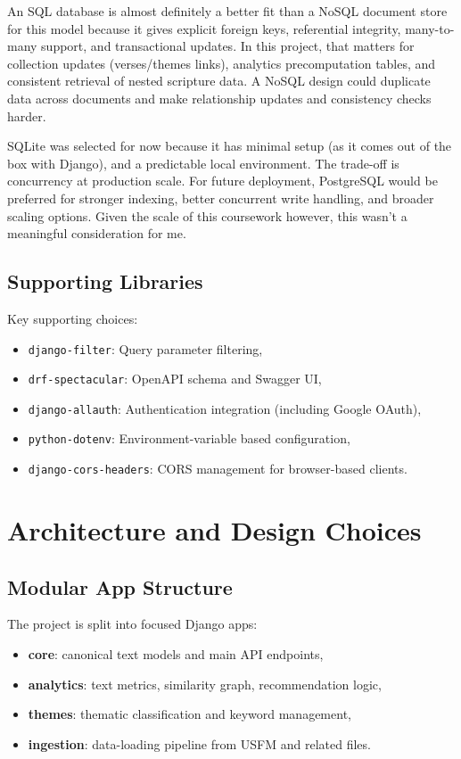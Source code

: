 \documentclass[11pt,a4paper]{article}
\begin{document}
An SQL database is almost definitely a better fit than a NoSQL document store for this model because it gives explicit foreign keys, referential integrity, many-to-many support, and transactional updates. In this project, that matters for collection updates (verses/themes links), analytics precomputation tables, and consistent retrieval of nested scripture data. A NoSQL design could duplicate data across documents and make relationship updates and consistency checks harder.

SQLite was selected for now because it has minimal setup (as it comes out of the box with Django), and a predictable local environment. The trade-off is concurrency at production scale. For future deployment, PostgreSQL would be preferred for stronger indexing, better concurrent write handling, and broader scaling options. Given the scale of this coursework however, this wasn't a meaningful consideration for me.

\subsection{Supporting Libraries}
Key supporting choices:
\begin{itemize}[leftmargin=*]
	\item \texttt{django-filter}: Query parameter filtering,
	\item \texttt{drf-spectacular}: OpenAPI schema and Swagger UI,
	\item \texttt{django-allauth}: Authentication integration (including Google OAuth),
	\item \texttt{python-dotenv}: Environment-variable based configuration,
	\item \texttt{django-cors-headers}: CORS management for browser-based clients.
\end{itemize}

\section{Architecture and Design Choices}
\subsection{Modular App Structure}
The project is split into focused Django apps:
\begin{itemize}[leftmargin=*]
	\item \textbf{core}: canonical text models and main API endpoints,
	\item \textbf{analytics}: text metrics, similarity graph, recommendation logic,
	\item \textbf{themes}: thematic classification and keyword management,
	\item \textbf{ingestion}: data-loading pipeline from USFM and related files.
\end{itemize}
\end{document}

